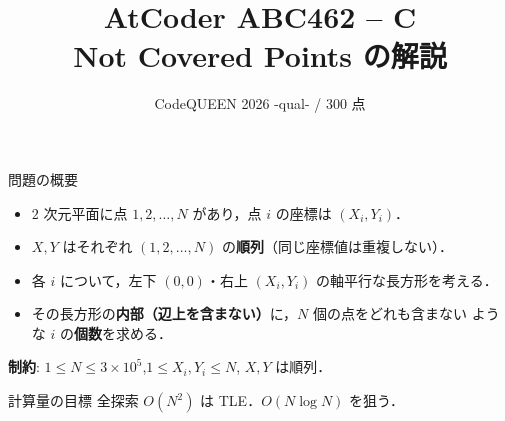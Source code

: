\documentclass[dvipdfmx,aspectratio=169]{beamer}
\title[ABC462 C]{AtCoder ABC462 -- C\\\small Not Covered Points の解説}
\author{}
\date[CodeQUEEN 2026]{CodeQUEEN 2026 -qual- / 300 点}
\begin{document}
\begin{frame}
  \titlepage
\end{frame}

\begin{frame}{問題の概要}
  \begin{itemize}
    \item $2$ 次元平面に点 $1,2,\ldots,N$ があり，点 $i$ の座標は $(X_i, Y_i)$．
    \item $X, Y$ はそれぞれ $(1,2,\ldots,N)$ の\textbf{順列}（同じ座標値は重複しない）．
    \item 各 $i$ について，左下 $(0,0)$・右上 $(X_i,Y_i)$ の軸平行な長方形を考える．
    \item その長方形の\textbf{内部（辺上を含まない）}に，$N$ 個の点をどれも含まない
      ような $i$ の\textbf{個数}を求める．
  \end{itemize}

  \vspace{0.8em}
  \textbf{制約}: $1 \le N \le 3\times 10^5$,\quad $1 \le X_i,Y_i \le N$,\quad
  $X,Y$ は順列．

  \vspace{0.4em}
  \begin{block}{計算量の目標}
    全探索 $O(N^2)$ は TLE．\textbf{$O(N\log N)$} を狙う．
  \end{block}
\end{frame}
\end{document}
